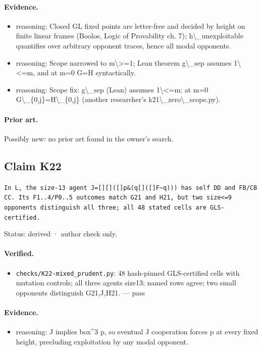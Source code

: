 \documentclass{article}
\begin{document}
\paragraph{Evidence.}
\begin{itemize}
\item reasoning: Closed GL fixed points are letter-free and decided by height on finite linear frames (Boolos, Logic of Provability ch. 7); h\textbackslash{}\_unexploitable quantifies over arbitrary opponent traces, hence all modal opponents.
\item reasoning: Scope narrowed to m\textbackslash{}\textgreater{}=1; Lean theorem g\textbackslash{}\_sep assumes 1\textbackslash{}\textless{}=m, and at m=0 G=H syntactically.
\item reasoning: Scope fix: g\textbackslash{}\_sep (Lean) assumes 1\textbackslash{}\textless{}=m; at m=0 G\textbackslash{}\_\{0,j\}=H\textbackslash{}\_\{0,j\} (another researcher's k21\textbackslash{}\_zero\textbackslash{}\_scope.py).
\end{itemize}

\paragraph{Prior art.} Possibly new: no prior art found in the owner's search.

\subsection*{Claim K22}

\texttt{In L, the size-13 agent J=[][]([]p\&(q\textbar{}[]([]F\textbar{}\textasciitilde{}q))) has self DD and FB/CB CC. Its F1..4/P0..5 outcomes match G21 and H21, but two size\textless{}=9 opponents distinguish all three; all 48 stated cells are GLS-certified.}

Status: derived · author check only.

\paragraph{Verified.}
\begin{itemize}
\item \texttt{checks/K22-mixed\_prudent.py}: 48 hash-pinned GLS-certified cells with mutation controls; all three agents size13; named rows agree; two small opponents distinguish G21,J,H21. --- pass
\end{itemize}

\paragraph{Evidence.}
\begin{itemize}
\item reasoning: J implies box\textasciicircum{}3 p, so eventual J cooperation forces p at every fixed height, precluding exploitation by any modal opponent.
\end{itemize}
\end{document}
